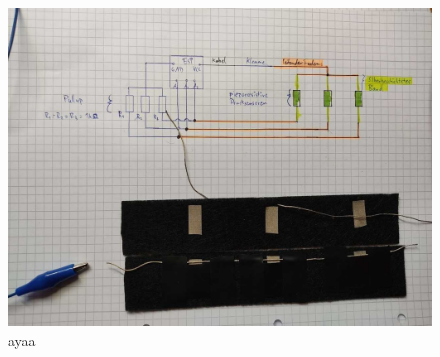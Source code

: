 \documentclass[12pt, a4paper]{article}
\begin{document}
\newpage




\begin{figure}[h]
	\centering
	\includegraphics[scale=.5]{assets/Prototyp.jpg}
	\caption{ayaa}
	\label{fig:Initial_drawing}
\end{figure}
\end{document}
